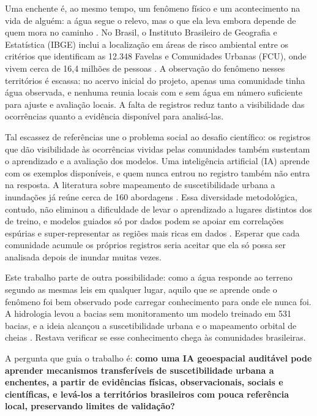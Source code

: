 \documentclass[conference]{IEEEtran}
\begin{document}
Uma enchente é, ao mesmo tempo, um fenômeno físico e um acontecimento na vida de alguém: a água segue o relevo, mas o que ela leva embora depende de quem mora no caminho \cite{adger}. No Brasil, o Instituto Brasileiro de Geografia e Estatística (IBGE) inclui a localização em áreas de risco ambiental entre os critérios que identificam as 12.348 Favelas e Comunidades Urbanas (FCU), onde vivem cerca de 16,4 milhões de pessoas \cite{ibge}. A observação do fenômeno nesses territórios é escassa: no acervo inicial do projeto, apenas uma comunidade tinha água observada, e nenhuma reunia locais com e sem água em número suficiente para ajuste e avaliação locais. A falta de registros reduz tanto a visibilidade das ocorrências quanto a evidência disponível para analisá-las.

Tal escassez de referências une o problema social ao desafio científico: os registros que dão visibilidade às ocorrências vividas pelas comunidades também sustentam o aprendizado e a avaliação dos modelos. Uma inteligência artificial (IA) aprende com os exemplos disponíveis, e quem nunca entrou no registro também não entra na resposta. A literatura sobre mapeamento de suscetibilidade urbana a inundações já reúne cerca de 160 abordagens \cite{islam}. Essa diversidade metodológica, contudo, não eliminou a dificuldade de levar o aprendizado a lugares distintos dos de treino, e modelos guiados só por dados podem se apoiar em correlações espúrias e super-representar as regiões mais ricas em dados \cite{bentivoglio,zhu}. Esperar que cada comunidade acumule os próprios registros seria aceitar que ela só possa ser analisada depois de inundar muitas vezes.

Este trabalho parte de outra possibilidade: como a água responde ao terreno segundo as mesmas leis em qualquer lugar, aquilo que se aprende onde o fenômeno foi bem observado pode carregar conhecimento para onde ele nunca foi. A hidrologia levou a bacias sem monitoramento um modelo treinado em 531 bacias, e a ideia alcançou a suscetibilidade urbana e o mapeamento orbital de cheias \cite{kratzertw,nearing,zhao,ratte}. Restava verificar se esse conhecimento chega às comunidades brasileiras.

A pergunta que guia o trabalho é: \textbf{como uma IA geoespacial auditável pode aprender mecanismos transferíveis de suscetibilidade urbana a enchentes, a partir de evidências físicas, observacionais, sociais e científicas, e levá-los a territórios brasileiros com pouca referência local, preservando limites de validação?}
\end{document}

